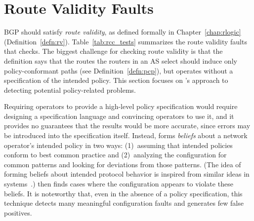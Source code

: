 \section{Route Validity Faults}\label{sec:validity}

BGP should satisfy {\em route validity}, as defined formally in
Chapter~\ref{chap:rlogic} (Definition~\ref{defn:rv}).
Table~\ref{tab:rcc_tests} summarizes the route validity faults that \rcc
checks.  The biggest challenge for checking route validity is
that the definition says that the routes the routers in an AS select
should induce only policy-conformant paths (see
Definition~\ref{defn:pcp}), but \rcc operates without a specification of
the intended policy.  This section focuses on \rccns's approach to
detecting potential policy-related problems.

Requiring operators to provide a high-level policy specification would
require designing a specification language and convincing operators to
use it, and it provides no guarantees that the results would be more
accurate, since errors may be introduced into the specification itself.
Instead, \rcc forms {\em beliefs} about a network operator's intended
policy in two ways: (1)~assuming that intended policies conform to best
common practice and (2)~analyzing the configuration for common patterns
and looking for deviations from those patterns.  (The idea of forming
beliefs about intended protocol behavior is inspired from similar ideas
in systems~\cite{Engler01}.)  \rcc then finds cases
where the configuration appears to violate these beliefs.  It is
noteworthy that, even in the absence of a policy specification, this
technique detects many meaningful configuration faults and generates few
false positives.


